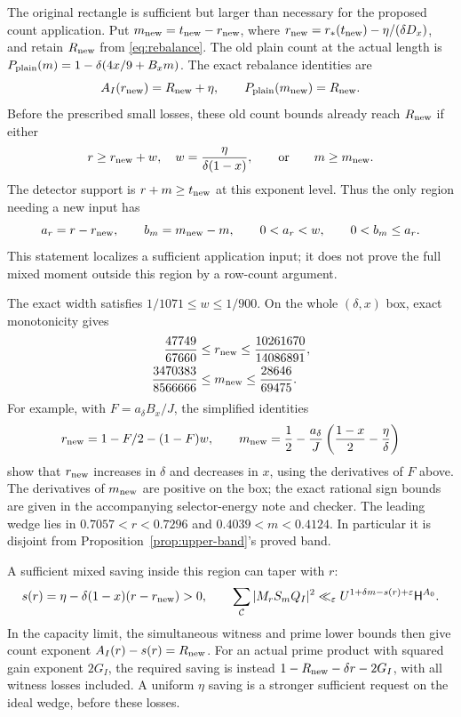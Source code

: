 \documentclass[11pt]{article}
\theoremstyle{definition}
\theoremstyle{remark}
\numberwithin{equation}{section}
\newcommand{\CC}{\mathcal C}
\newcommand{\HH}{\mathsf H}
\newcommand{\ee}{\varepsilon}
\begin{document}
The original rectangle is sufficient but larger than necessary for the
proposed count application. Put $m_{\rm new}=t_{\rm new}-r_{\rm new}$,
where $r_{\rm new}=r_*(t_{\rm new})-\eta/(\delta D_x)$, and retain
$R_{\rm new}$ from \eqref{eq:rebalance}. The old plain count at the
actual length is $P_{\rm plain}(m)=1-\delta(4x/9+B_xm)$. The exact
rebalance identities are
\begin{equation}\label{eq:wedge-crossing}
A_I(r_{\rm new})=R_{\rm new}+\eta,\qquad
P_{\rm plain}(m_{\rm new})=R_{\rm new}.
\end{equation}
Before the prescribed small losses, these old count bounds already
reach $R_{\rm new}$ if either
\[
r\ge r_{\rm new}+w,\quad w=\frac{\eta}{\delta(1-x)},
\qquad\hbox{or}\qquad m\ge m_{\rm new}.
\]
The detector support is $r+m\ge t_{\rm new}$ at this exponent
level. Thus the only region needing a new input has
\begin{equation}\label{eq:application-wedge}
a_r=r-r_{\rm new},\qquad b_m=m_{\rm new}-m,
\qquad 0<a_r<w,\qquad 0<b_m\le a_r.
\end{equation}
This statement localizes a sufficient application input; it does not
prove the full mixed moment outside this region by a row-count argument.

The exact width satisfies $1/1071\le w\le1/900$. On the whole
$(\delta,x)$ box, exact monotonicity gives
\begin{align*}
\frac{47749}{67660}&\le r_{\rm new}\le\frac{10261670}{14086891},\\
\frac{3470383}{8566666}&\le m_{\rm new}\le\frac{28646}{69475}.
\end{align*}
For example, with $F=a_\delta B_x/J$, the simplified identities
\[
r_{\rm new}=1-F/2-(1-F)w,\qquad
m_{\rm new}=\frac12-\frac{a_\delta}{J}
 \left(\frac{1-x}{2}-\frac\eta\delta\right)
\]
show that $r_{\rm new}$ increases in $\delta$ and decreases in $x$,
using the derivatives of $F$ above. The derivatives of $m_{\rm new}$
are positive on the box; the exact rational sign bounds are given in
the accompanying selector-energy note and checker. The leading wedge
lies in $0.7057<r<0.7296$ and $0.4039<m<0.4124$.
In particular it is disjoint from Proposition~\ref{prop:upper-band}'s
proved band.

A sufficient mixed saving inside this region can taper with $r$:
\begin{equation}\label{eq:tapered-target}
s(r)=\eta-\delta(1-x)(r-r_{\rm new})>0,\qquad
\sum_{\CC}|M_rS_mQ_I|^2
\ll_\ee U^{1+\delta m-s(r)+\ee}\HH^{A_0}.
\end{equation}
In the capacity limit, the simultaneous witness and prime lower bounds
then give count exponent $A_I(r)-s(r)=R_{\rm new}$. For an actual
prime product with squared gain exponent $2G_I$, the required saving
is instead $1-R_{\rm new}-\delta r-2G_I$, with all witness losses
included. A uniform $\eta$ saving is a stronger sufficient request
on the ideal wedge, before these losses.
\end{document}
